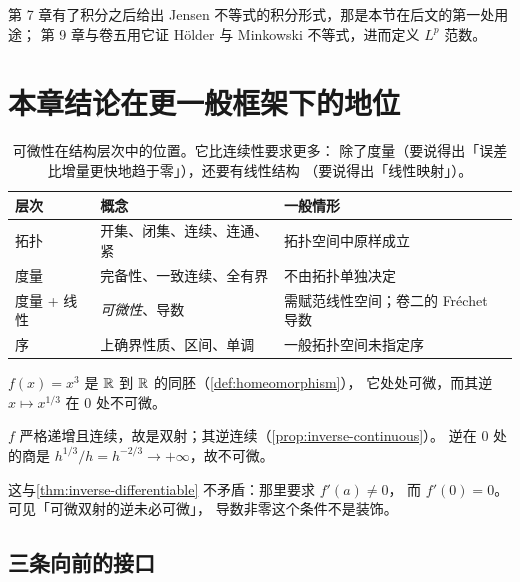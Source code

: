 \begin{remark}
  第 7 章有了积分之后给出 Jensen 不等式的积分形式，那是本节在后文的第一处用途；
  第 9 章与卷五用它证 Hölder 与 Minkowski 不等式，进而定义 \(L^{p}\) 范数。
\end{remark}

\section{本章结论在更一般框架下的地位}
\label{sec:ch6-outlook}

\begin{table}[htbp]
  \centering
  \caption{可微性在结构层次中的位置。它比连续性要求更多：
    除了度量（要说得出「误差比增量更快地趋于零」），还要有线性结构
    （要说得出「线性映射」）。}
  \label{tab:ch6-structure}
  \begin{tabular}{@{}llp{5.2cm}@{}}
    \toprule
    层次 & 概念 & 一般情形 \\
    \midrule
    拓扑 & 开集、闭集、连续、连通、紧 & 拓扑空间中原样成立 \\
    度量 & 完备性、一致连续、全有界 & 不由拓扑单独决定 \\
    度量 + 线性 & \emph{可微性}、导数 & 需赋范线性空间；卷二的 Fréchet 导数 \\
    序 & 上确界性质、区间、单调 & 一般拓扑空间未指定序 \\
    \bottomrule
  \end{tabular}
\end{table}

\begin{example}[同胚不保持可微性]
  \label{ex:homeo-not-differentiable}
  \(f(x)=x^{3}\) 是 \(\mathbb{R}\) 到 \(\mathbb{R}\) 的同胚（\cref{def:homeomorphism}），
  它处处可微，而其逆 \(x \mapsto x^{1/3}\) 在 \(0\) 处不可微。
  \begin{worked}
    \(f\) 严格递增且连续，故是双射；其逆连续（\cref{prop:inverse-continuous}）。
    逆在 \(0\) 处的商是 \(h^{1/3}/h = h^{-2/3} \to +\infty\)，故不可微。

    这与\cref{thm:inverse-differentiable} 不矛盾：那里要求 \(f'(a) \neq 0\)，
    而 \(f'(0)=0\)。可见「可微双射的逆未必可微」，
    导数非零这个条件不是装饰。
  \end{worked}
\end{example}

\subsection*{三条向前的接口}


